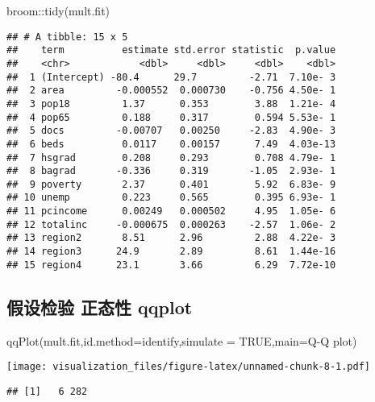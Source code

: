 \documentclass[
]{article}
\newenvironment{Shaded}{\begin{snugshade}}{\end{snugshade}}
\newcommand{\AttributeTok}[1]{\textcolor[rgb]{0.77,0.63,0.00}{#1}}
\newcommand{\ConstantTok}[1]{\textcolor[rgb]{0.00,0.00,0.00}{#1}}
\newcommand{\FunctionTok}[1]{\textcolor[rgb]{0.00,0.00,0.00}{#1}}
\newcommand{\NormalTok}[1]{#1}
\newcommand{\SpecialCharTok}[1]{\textcolor[rgb]{0.00,0.00,0.00}{#1}}
\newcommand{\StringTok}[1]{\textcolor[rgb]{0.31,0.60,0.02}{#1}}
\begin{document}
\begin{Shaded}
\begin{Highlighting}[]
\NormalTok{broom}\SpecialCharTok{::}\FunctionTok{tidy}\NormalTok{(mult.fit)}
\end{Highlighting}
\end{Shaded}

\begin{verbatim}
## # A tibble: 15 x 5
##    term          estimate std.error statistic  p.value
##    <chr>            <dbl>     <dbl>     <dbl>    <dbl>
##  1 (Intercept) -80.4      29.7         -2.71  7.10e- 3
##  2 area         -0.000552  0.000730    -0.756 4.50e- 1
##  3 pop18         1.37      0.353        3.88  1.21e- 4
##  4 pop65         0.188     0.317        0.594 5.53e- 1
##  5 docs         -0.00707   0.00250     -2.83  4.90e- 3
##  6 beds          0.0117    0.00157      7.49  4.03e-13
##  7 hsgrad        0.208     0.293        0.708 4.79e- 1
##  8 bagrad       -0.336     0.319       -1.05  2.93e- 1
##  9 poverty       2.37      0.401        5.92  6.83e- 9
## 10 unemp         0.223     0.565        0.395 6.93e- 1
## 11 pcincome      0.00249   0.000502     4.95  1.05e- 6
## 12 totalinc     -0.000675  0.000263    -2.57  1.06e- 2
## 13 region2       8.51      2.96         2.88  4.22e- 3
## 14 region3      24.9       2.89         8.61  1.44e-16
## 15 region4      23.1       3.66         6.29  7.72e-10
\end{verbatim}

\hypertarget{ux5047ux8bbeux68c0ux9a8c-ux6b63ux6001ux6027-qqplot}{%
\subsection{假设检验 正态性
qqplot}\label{ux5047ux8bbeux68c0ux9a8c-ux6b63ux6001ux6027-qqplot}}

\begin{Shaded}
\begin{Highlighting}[]
\FunctionTok{qqPlot}\NormalTok{(mult.fit,}\AttributeTok{id.method=}\StringTok{\textquotesingle{}identify\textquotesingle{}}\NormalTok{,}\AttributeTok{simulate =} \ConstantTok{TRUE}\NormalTok{,}\AttributeTok{main=}\StringTok{\textquotesingle{}Q{-}Q plot\textquotesingle{}}\NormalTok{)}
\end{Highlighting}
\end{Shaded}

\texttt{[image: visualization\_files/figure-latex/unnamed-chunk-8-1.pdf]}

\begin{verbatim}
## [1]   6 282
\end{verbatim}
\end{document}
